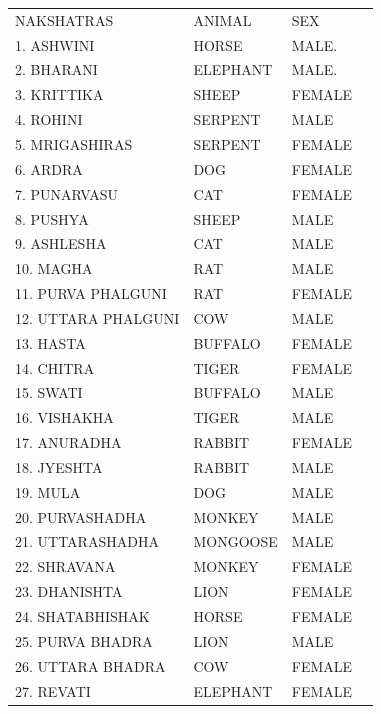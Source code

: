 \begin{center}
\begin{tabular}{ l l l l}

 NAKSHATRAS              & ANIMAL             &SEX \\

1.    ASHWINI	&HORSE	&MALE.                             \\
2.    BHARANI	&ELEPHANT	&MALE.                      \\
3.    KRITTIKA	&SHEEP	&FEMALE                           \\
4.    ROHINI	&SERPENT	&MALE                         \\
5.    MRIGASHIRAS	&SERPENT	&FEMALE                         \\
6.    ARDRA	&DOG	&FEMALE                         \\
7.    PUNARVASU	&CAT	&FEMALE                         \\
8.    PUSHYA	&SHEEP	&MALE                         \\
9.    ASHLESHA	&CAT	&MALE                         \\
10.  MAGHA	&RAT	&MALE                         \\
11.  PURVA PHALGUNI	&RAT	&FEMALE                         \\
12.  UTTARA PHALGUNI	&COW	&MALE                         \\
13.  HASTA	&BUFFALO	&FEMALE                         \\
14.  CHITRA	&TIGER	&FEMALE                         \\
15.  SWATI	&BUFFALO	&MALE                         \\
16.  VISHAKHA	&TIGER	&MALE                         \\
17.  ANURADHA	&RABBIT	&FEMALE                         \\
18.  JYESHTA	&RABBIT	&MALE                         \\
19.  MULA	&DOG	&MALE                         \\
20.  PURVASHADHA	&MONKEY	&MALE                         \\
21.  UTTARASHADHA	&MONGOOSE	&MALE                         \\
22.  SHRAVANA	&MONKEY	&FEMALE                         \\
23.  DHANISHTA	&LION	&FEMALE                         \\
24.  SHATABHISHAK	&HORSE	&FEMALE                         \\
25.  PURVA BHADRA	&LION	&MALE                         \\
26.  UTTARA BHADRA	&COW	&FEMALE                         \\
27.  REVATI	&ELEPHANT	&FEMALE                         \\
 
 \end{tabular}
\end{center}
 


